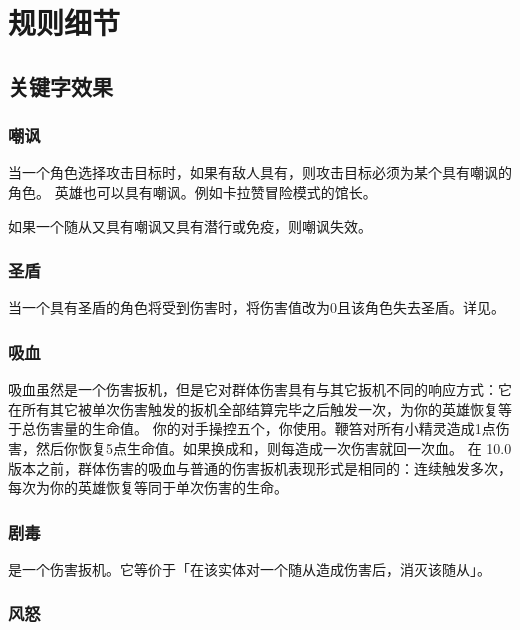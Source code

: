 \chapter{规则细节}
\label{rule-detail}

\setcounter{tocdepth}{2}
\section{关键字效果}
\label{keyword}

\subsection{嘲讽}
\label{taunt}

当一个角色选择攻击目标时，如果有敌人具有，则攻击目标必须为某个具有嘲讽的角色。
\notice 英雄也可以具有嘲讽。例如卡拉赞冒险模式的馆长。

如果一个随从又具有嘲讽又具有潜行或免疫，则嘲讽失效。

\subsection{圣盾}
\label{divine-shield}

当一个具有圣盾的角色将受到伤害时，将伤害值改为0且该角色失去圣盾。详见。

\subsection{吸血}
\label{lifesteal}

 吸血虽然是一个伤害扳机，但是它对群体伤害具有与其它扳机不同的响应方式：它在所有其它被单次伤害触发的扳机全部结算完毕之后触发一次，为你的英雄恢复等于总伤害量的生命值。
\example 你的对手操控五个，你使用。鞭笞对所有小精灵造成1点伤害，然后你恢复5点生命值。如果换成和，则每造成一次伤害就回一次血。
\notice 在 10.0 版本之前，群体伤害的吸血与普通的伤害扳机表现形式是相同的：连续触发多次，每次为你的英雄恢复等同于单次伤害的生命。

\subsection{剧毒}
\label{poisonous}

是一个伤害扳机。它等价于「在该实体对一个随从造成伤害后，消灭该随从」。

\subsection{风怒}
\label{windfury}

